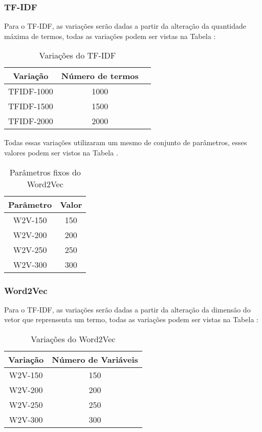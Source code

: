 \subsubsection{TF-IDF}
Para o TF-IDF, as variações serão dadas a  partir da alteração da quantidade máxima de termos, todas as variações podem ser vistas na Tabela \label{tab:tfidf_vars}:
\begin{table}[H]
\label{tab:tfidf_vars}
\centering
\begin{tabular}{|c| c | c|}
\hline
Variação & Número de termos  \\ 
\hline
TFIDF-1000 & 1000 \\
\hline
TFIDF-1500  & 1500 \\
\hline
TFIDF-2000  & 2000 \\
\hline 
\end{tabular}
\caption{\label{tab:n_categorias}Variações do TF-IDF}
\end{table}

Todas essas variações utilizaram um mesmo de conjunto de parâmetros, esses valores podem ser vistos na Tabela \label{tab:w2v_fix_vars}.

\begin{table}[H]
\label{tab:w2v_vars}
\centering
\begin{tabular}{|c| c|}
\hline
Parâmetro &  Valor  \\ 
\hline
W2V-150 &  150 \\
\hline
W2V-200 & 200 \\
\hline
W2V-250 &  250 \\
\hline   
W2V-300 & 300 \\
\hline 
\end{tabular}
\caption{Parâmetros fixos do Word2Vec}
\end{table}

\subsubsection{Word2Vec}

Para o TF-IDF, as variações serão dadas a  partir da alteração da dimensão do vetor que reprensenta um termo, todas as variações podem ser vistas na Tabela \label{tab:w2v_vars}:
\begin{table}[H]
\label{tab:w2v_vars}
\centering
\begin{tabular}{|c| c|}
\hline
Variação &  Número de Variáveis  \\ 
\hline
W2V-150 &  150 \\
\hline
W2V-200 & 200 \\
\hline
W2V-250 &  250 \\
\hline   
W2V-300 & 300 \\
\hline 
\end{tabular}
\caption{Variações do Word2Vec}
\end{table}


